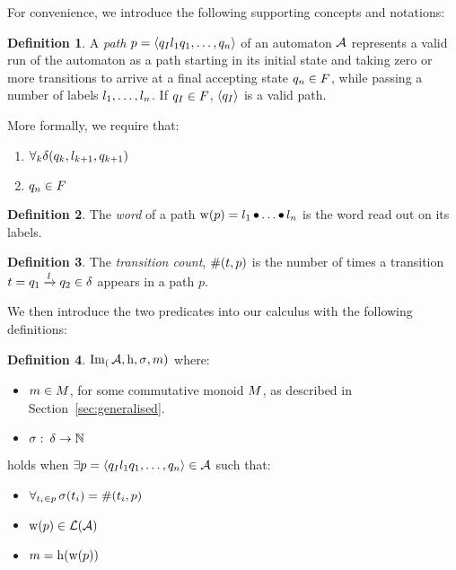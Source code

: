\documentclass{easychair}
\theoremstyle{definition}
\newtheorem{definition}{Definition}[section]
\begin{document}
For convenience, we introduce the following supporting concepts and notations:

\begin{definition}
  A \textit{path} $p = \left\langle q_I l_1 q_1 , \ldots , q_n\right\rangle$ of an
  automaton $\mathcal{A}$ represents a valid run of the automaton as a path
  starting in its initial state and taking zero or more transitions to arrive at
  a final accepting state $q_n \in F$, while passing a number of labels
  $l_1, \ldots, l_n$. If $q_I \in F$, $\left\langle q_I\right\rangle$
  is a valid path.
  
  More formally, we require that:
  \begin{enumerate}
    \item $\forall_{k} \delta(q_k, l_{k+1}, q_{k+1})$
    \item $q_n \in F$
  \end{enumerate}
\end{definition}

\begin{definition}
  The \textit{word} of a path $\operatorname{w}(p) = l_1 \operatorname{\bullet} \ldots \operatorname{\bullet} l_n$ is
  the word read out on its labels.
\end{definition}

\begin{definition}
 The \textit{transition count}, $\operatorname{\#}(t, p)$ is the
 number of times a transition $t =
 q_1 \xrightarrow{l} q_2 \in \delta$ appears in a path
 $p$.
\end{definition}

We then introduce the two predicates into our calculus with the following
definitions:

\begin{definition}
  $\operatorname{Im}_(\mathcal{A}, \operatorname{h}, \operatorname{\sigma}, m)$ where:
  \begin{itemize}
    \item $m \in M$, for some commutative monoid $M$,
    as described in Section~\ref{sec:generalised}.
    \item $\operatorname{\sigma}:\: \delta \to \mathbb{N}$
  \end{itemize}
  holds when $\exists p = \left\langle q_I l_1 q_1 , \ldots , q_n\right\rangle \in \mathcal{A}$ such that:
  \begin{itemize}
    \item $\forall_{t_i \in p} \operatorname{\sigma}(t_i) =
    \operatorname{\#}(t_i, p)$
    \item $\operatorname{w}(p) \in \operatorname{\mathcal{L}}(\mathcal{A})$
    \item $m = \operatorname{h}(\operatorname{w}(p))$
  \end{itemize}
\end{definition}
\end{document}
